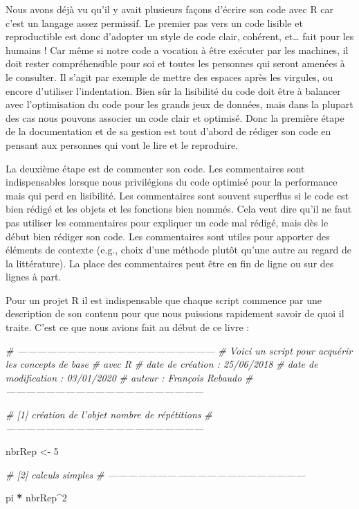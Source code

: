 \documentclass[
]{book}
\newenvironment{Shaded}{\begin{snugshade}}{\end{snugshade}}
\newcommand{\CommentTok}[1]{\textcolor[rgb]{0.56,0.35,0.01}{\textit{#1}}}
\newcommand{\DecValTok}[1]{\textcolor[rgb]{0.00,0.00,0.81}{#1}}
\newcommand{\NormalTok}[1]{#1}
\newcommand{\OperatorTok}[1]{\textcolor[rgb]{0.81,0.36,0.00}{\textbf{#1}}}
\newcommand{\StringTok}[1]{\textcolor[rgb]{0.31,0.60,0.02}{#1}}
\begin{document}
Nous avons déjà vu qu'il y avait plusieurs façons d'écrire son code avec R car c'est un langage assez permissif. Le premier pas vers un code lisible et reproductible est donc d'adopter un style de code clair, cohérent, et\ldots{} fait pour les humains ! Car même si notre code a vocation à être exécuter par les machines, il doit rester compréhensible pour soi et toutes les personnes qui seront amenées à le consulter. Il s'agit par exemple de mettre des espaces après les virgules, ou encore d'utiliser l'indentation. Bien sûr la lisibilité du code doit être à balancer avec l'optimisation du code pour les grands jeux de données, mais dans la plupart des cas nous pouvons associer un code clair et optimisé. Donc la première étape de la documentation et de sa gestion est tout d'abord de rédiger son code en pensant aux personnes qui vont le lire et le reproduire.

La deuxième étape est de commenter son code. Les commentaires sont indispensables lorsque nous privilégions du code optimisé pour la performance mais qui perd en lisibilité. Les commentaires sont souvent superflus si le code est bien rédigé et les objets et les fonctions bien nommés. Cela veut dire qu'il ne faut pas utiliser les commentaires pour expliquer un code mal rédigé, mais dès le début bien rédiger son code. Les commentaires sont utiles pour apporter des éléments de contexte (e.g., choix d'une méthode plutôt qu'une autre au regard de la littérature). La place des commentaires peut être en fin de ligne ou sur des lignes à part.

Pour un projet R il est indispensable que chaque script commence par une description de son contenu pour que nous puissions rapidement savoir de quoi il traite. C'est ce que nous avions fait au début de ce livre :

\begin{Shaded}
\begin{Highlighting}[]
\CommentTok{# ------------------------------------------------------------}
\CommentTok{# Voici un script pour acquérir les concepts de base }
\CommentTok{# avec R}
\CommentTok{# date de création : 25/06/2018}
\CommentTok{# date de modification : 03/01/2020}
\CommentTok{# auteur : François Rebaudo}
\CommentTok{# ------------------------------------------------------------}

\CommentTok{# [1] création de l'objet nombre de répétitions}
\CommentTok{# ------------------------------------------------------------}

\NormalTok{nbrRep <-}\StringTok{ }\DecValTok{5}

\CommentTok{# [2] calculs simples}
\CommentTok{# ------------------------------------------------------------}

\NormalTok{pi }\OperatorTok{*}\StringTok{ }\NormalTok{nbrRep}\OperatorTok{^}\DecValTok{2}
\end{Highlighting}
\end{Shaded}
\end{document}
